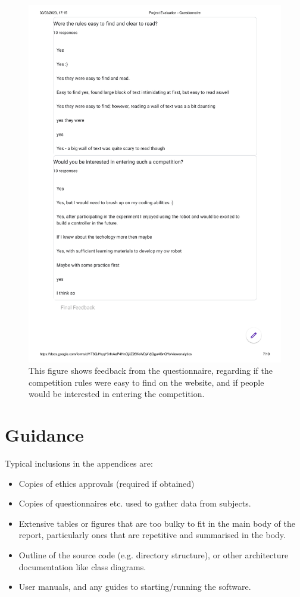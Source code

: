 \documentclass{l4proj}
\begin{document}
\begin{appendices}
\begin{figure}
    \centering
    \includegraphics[width=1\textwidth]{images/website-question-2.pdf}
    \caption{This figure shows feedback from the questionnaire, regarding if the competition rules were easy to find on the website, and if people would be interested in entering the competition.}
    \label{fig:feedback-2}
\end{figure}


\chapter{Guidance}
Typical inclusions in the appendices are:
\begin{itemize}
\item
  Copies of ethics approvals (required if obtained)
\item
  Copies of questionnaires etc. used to gather data from subjects.
\item
  Extensive tables or figures that are too bulky to fit in the main body of
  the report, particularly ones that are repetitive and summarised in the body.
\item Outline of the source code (e.g. directory structure), or other architecture documentation like class diagrams.
\item User manuals, and any guides to starting/running the software.
\end{itemize}

\end{appendices}
\end{document}
